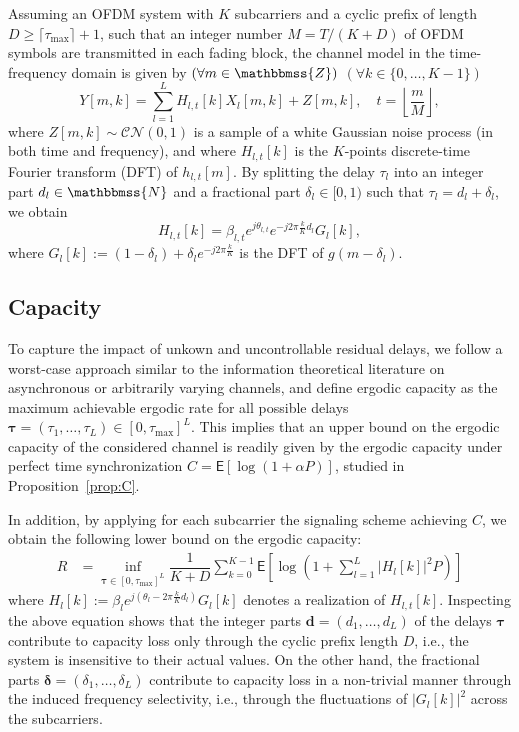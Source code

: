 \documentclass[10pt,journal,a4paper]{IEEEtran}
\newcommand{\eqdef}{:=}
\newcommand{\E}{\mathsf{E}}		%
\newcommand{\stdset}[1]{\mathbbmss{#1}}	%
\renewcommand{\vec}[1]{\bm{#1}}		%
\newcommand{\CN}{\mathcal{CN}}			%
\begin{document}
Assuming an OFDM system with $K$ subcarriers and a cyclic prefix of length $D \geq \lceil \tau_{\max} \rceil +1$, such that an integer number $M = T/(K+D)$ of OFDM symbols are transmitted in each fading block, the channel model in the time-frequency domain is given by $(\forall m \in \stdset{Z})$ $(\forall k\in \{0,\ldots,K-1\})$
\begin{equation*}
Y[m,k] = \sum_{l=1}^LH_{l,t}[k]X_l[m,k] + Z[m,k],\quad t=\left\lfloor \frac{m}{M}\right\rfloor, 
\end{equation*}
where $Z[m,k]\sim \CN(0,1)$ is a sample of a white Gaussian noise process (in both time and frequency), and where $H_{l,t}[k]$ is the $K$-points discrete-time Fourier transform (DFT) of $h_{l,t}[m]$. By splitting the delay $\tau_l$ into an integer part $d_l \in \stdset{N}$ and a fractional part $\delta_l \in [0,1)$ such that $\tau_l = d_l + \delta_l$, we obtain
\begin{equation*}
H_{l,t}[k] = \beta_{l,t} e^{j\theta_{l,t}}e^{-j2\pi \frac{k}{K}d_l}G_l[k],
\end{equation*}
where $G_l[k] \eqdef (1-\delta_l) + \delta_le^{-j2\pi\frac{k}{K}}$ is the DFT of $g(m-\delta_l)$.

\subsection{Capacity}
To capture the impact of unkown and uncontrollable residual delays, we follow a worst-case approach similar to the information theoretical literature on asynchronous \cite{cover1982asynchronous} or arbitrarily varying \cite{blackwell1960capacities} channels, and define ergodic capacity as the maximum achievable ergodic rate for all possible delays $\vec{\tau}= (\tau_1,\ldots,\tau_L) \in [0,\tau_{\max}]^L$. This implies that an upper bound on the ergodic capacity of the considered channel is readily given by the ergodic capacity under perfect time synchronization $C = \E[\log(1+\alpha P)]$, studied in Proposition~\ref{prop:C}. 

In addition, by applying for each subcarrier the signaling scheme achieving $C$, we obtain the following lower bound on the ergodic capacity:
\begin{align}\label{eq:C_worstcase_def}
R &= \inf_{\vec{\tau}\in[0,\tau_{\max}]^L}\dfrac{1}{K+D}\sum_{k=0}^{K-1}\E\left[\log\left(1+\sum_{l=1}^L|H_l[k]|^2P\right)\right]
\end{align} 
where $H_l[k] \eqdef \beta_le^{j(\theta_l-2\pi \frac{k}{K}d_l)}G_l[k]$ denotes a realization of $H_{l,t}[k]$. Inspecting the above equation shows that the integer parts $\vec{d}=(d_1,\ldots,d_L)$ of the delays $\vec{\tau}$ contribute to capacity loss only through the cyclic prefix length $D$, i.e., the system is insensitive to their actual values. On the other hand, the fractional parts $\vec{\delta}=(\delta_1,\ldots,\delta_L)$ contribute to capacity loss in a non-trivial manner through the induced frequency selectivity, i.e., through the fluctuations of $|G_l[k]|^2$ across the subcarriers. 
\end{document}
